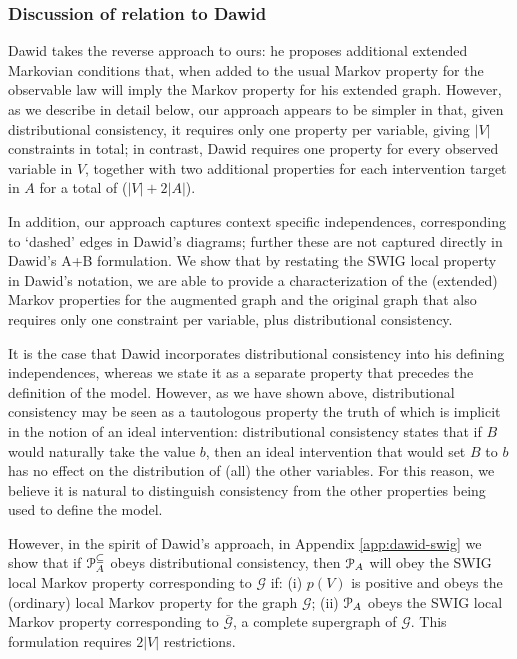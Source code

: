 \documentclass[11pt]{article}
\newcommand{\G}{{\mathscr G}}
\begin{document}
{\subsubsection{Discussion of relation to Dawid}

Dawid takes the reverse approach to ours: he proposes additional extended Markovian conditions that, when added to the usual Markov property for the observable law will imply the Markov property for his extended graph. However, as we describe in detail below, our approach appears to be  simpler in that, given distributional consistency, it requires only one property per variable, giving $|V|$ constraints in total; in contrast, Dawid requires one property for every observed variable in $V$, together with two additional properties for each intervention target in $A$ for a total of ($|V|+2|A|$).

In addition, our approach captures context specific independences, corresponding to `dashed' edges in Dawid's diagrams; further these are not captured directly in Dawid's A+B formulation.
 We show that by restating the SWIG local property in Dawid's notation, we are able to provide a characterization of the (extended) Markov properties for the augmented graph and the original graph that also requires only one constraint per variable, plus distributional consistency.

It is the case that Dawid incorporates distributional consistency into his defining independences, whereas we state it as a separate property that precedes the definition of the model. However, as we have shown above, distributional consistency may be seen as a tautologous property the truth of which is implicit in the notion of an ideal intervention: distributional consistency states that if $B$ would naturally take the value $b$, then an ideal intervention that would set $B$ to $b$ has no effect on the distribution of (all) the other variables. For this reason, we believe it is natural to distinguish consistency from the other properties being used to define the model.

However, in the spirit of Dawid's approach, in Appendix \ref{app:dawid-swig} we show that 
if ${\cal P}^{\subseteq}_A$ obeys distributional consistency, then 
${\cal P}_A$ will obey the SWIG local Markov property corresponding to ${\G}$ if:  
(i) $p(V)$ is positive and obeys the (ordinary) local Markov property for the graph $\G$;
(ii) ${\cal P}_A$ obeys the SWIG local Markov property corresponding to $\overline{\G}$, a complete supergraph of $\G$. This formulation requires $2|V|$ restrictions.





}
\end{document}
